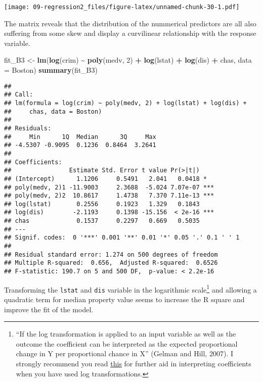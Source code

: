 \documentclass[
]{book}
\newenvironment{Shaded}{\begin{snugshade}}{\end{snugshade}}
\newcommand{\AttributeTok}[1]{\textcolor[rgb]{0.13,0.29,0.53}{#1}}
\newcommand{\DecValTok}[1]{\textcolor[rgb]{0.00,0.00,0.81}{#1}}
\newcommand{\FunctionTok}[1]{\textcolor[rgb]{0.13,0.29,0.53}{\textbf{#1}}}
\newcommand{\NormalTok}[1]{#1}
\newcommand{\OtherTok}[1]{\textcolor[rgb]{0.56,0.35,0.01}{#1}}
\newcommand{\SpecialCharTok}[1]{\textcolor[rgb]{0.81,0.36,0.00}{\textbf{#1}}}
\begin{document}
\texttt{[image: 09-regression2\_files/figure-latex/unnamed-chunk-30-1.pdf]}

The matrix reveals that the distribution of the nummerical predictors are all also suffering from some skew and display a curvilinear relationship with the response variable.

\begin{Shaded}
\begin{Highlighting}[]
\NormalTok{fit\_B3 }\OtherTok{\textless{}{-}} \FunctionTok{lm}\NormalTok{(}\FunctionTok{log}\NormalTok{(crim) }\SpecialCharTok{\textasciitilde{}} \FunctionTok{poly}\NormalTok{(medv, }\DecValTok{2}\NormalTok{) }\SpecialCharTok{+} \FunctionTok{log}\NormalTok{(lstat) }\SpecialCharTok{+} \FunctionTok{log}\NormalTok{(dis) }\SpecialCharTok{+}\NormalTok{ chas, }\AttributeTok{data =}\NormalTok{ Boston)}
\FunctionTok{summary}\NormalTok{(fit\_B3)}
\end{Highlighting}
\end{Shaded}

\begin{verbatim}
## 
## Call:
## lm(formula = log(crim) ~ poly(medv, 2) + log(lstat) + log(dis) + 
##     chas, data = Boston)
## 
## Residuals:
##     Min      1Q  Median      3Q     Max 
## -4.5307 -0.9095  0.1236  0.8464  3.2641 
## 
## Coefficients:
##                Estimate Std. Error t value Pr(>|t|)    
## (Intercept)      1.1206     0.5491   2.041   0.0418 *  
## poly(medv, 2)1 -11.9003     2.3688  -5.024 7.07e-07 ***
## poly(medv, 2)2  10.8617     1.4738   7.370 7.11e-13 ***
## log(lstat)       0.2556     0.1923   1.329   0.1843    
## log(dis)        -2.1193     0.1398 -15.156  < 2e-16 ***
## chas             0.1537     0.2297   0.669   0.5035    
## ---
## Signif. codes:  0 '***' 0.001 '**' 0.01 '*' 0.05 '.' 0.1 ' ' 1
## 
## Residual standard error: 1.274 on 500 degrees of freedom
## Multiple R-squared:  0.656,  Adjusted R-squared:  0.6526 
## F-statistic: 190.7 on 5 and 500 DF,  p-value: < 2.2e-16
\end{verbatim}

Transforming the \texttt{lstat} and \texttt{dis} variable in the logarithmic scale\footnote{``If the log transformation is applied to an input variable as well as the outcome the coefficient can be interpreted as the expected proportional change in Y per proportional chance in X'' (Gelman and Hill, 2007). I strongly recommend you read \href{https://stats.oarc.ucla.edu/sas/faq/how-can-i-interpret-log-transformed-variables-in-terms-of-percent-change-in-linear-regression/}{this} for further aid in interpreting coefficients when you have used log transformations.} and allowing a quadratic term for median property value seems to increase the R square and improve the fit of the model.
\end{document}
